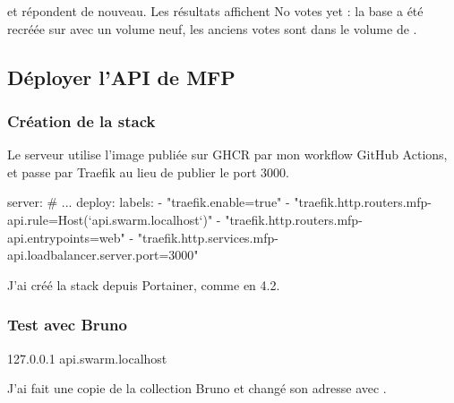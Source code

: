  et  répondent de nouveau. Les résultats affichent \og No votes yet\fg{} : la base a été recréée sur  avec un volume neuf, les anciens votes sont dans le volume de .


\subsection{Déployer l'API de MFP}

\subsubsection{Création de la stack}

Le serveur utilise l'image publiée sur GHCR par mon workflow GitHub Actions, et passe par Traefik au lieu de publier le port 3000.

\begin{fichier}
  server:
    # ...
    deploy:
      labels:
        - "traefik.enable=true"
        - "traefik.http.routers.mfp-api.rule=Host(`api.swarm.localhost`)"
        - "traefik.http.routers.mfp-api.entrypoints=web"
        - "traefik.http.services.mfp-api.loadbalancer.server.port=3000"
\end{fichier}

J'ai créé la stack  depuis Portainer, comme en 4.2.



\subsubsection{Test avec Bruno}

\begin{fichier}[text]
127.0.0.1   api.swarm.localhost
\end{fichier}

J'ai fait une copie de la collection Bruno et changé son adresse avec .

\begin{commandes}
\end{commandes}

